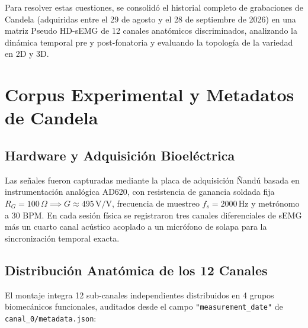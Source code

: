 \documentclass[11pt,a4paper,openany]{book}
\theoremstyle{definition}
\begin{document}
Para resolver estas cuestiones, se consolidó el historial completo de grabaciones de Candela (adquiridas entre el 29 de agosto y el 28 de septiembre de 2026) en una matriz Pseudo HD-sEMG de 12 canales anatómicos discriminados, analizando la dinámica temporal pre y post-fonatoria y evaluando la topología de la variedad en 2D y 3D.

\section{Corpus Experimental y Metadatos de Candela}

\subsection{Hardware y Adquisición Bioeléctrica}
Las señales fueron capturadas mediante la placa de adquisición Ñandú basada en instrumentación analógica AD620, con resistencia de ganancia soldada fija $R_G = 100\,\Omega \implies G \approx 495\,\text{V/V}$, frecuencia de muestreo $f_s = 2000\,\text{Hz}$ y metrónomo a 30 BPM. En cada sesión física se registraron tres canales diferenciales de sEMG más un cuarto canal acústico acoplado a un micrófono de solapa para la sincronización temporal exacta.

\subsection{Distribución Anatómica de los 12 Canales}
El montaje integra 12 sub-canales independientes distribuidos en 4 grupos biomecánicos funcionales, auditados desde el campo \texttt{"measurement\_date"} de \texttt{canal\_0/metadata.json}:
\end{document}
